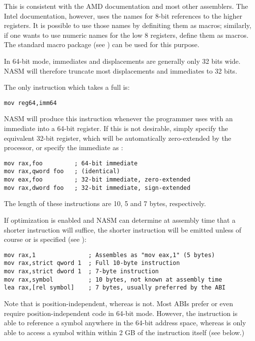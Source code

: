 This is consistent with the AMD documentation and most other
assemblers. The Intel documentation, however, uses the names
 for 8-bit references to the higher registers. It is
possible to use those names by definiting them as macros; similarly,
if one wants to use numeric names for the low 8 registers, define them
as macros. The standard macro package  (see
) can be used for this purpose.


In 64-bit mode, immediates and displacements are generally only 32
bits wide. NASM will therefore truncate most displacements and
immediates to 32 bits.

The only instruction which takes a full  is:

\begin{lstlisting}
mov reg64,imm64
\end{lstlisting}

NASM will produce this instruction whenever the programmer uses
 with an immediate into a 64-bit register. If this is not
desirable, simply specify the equivalent 32-bit register, which will
be automatically zero-extended by the processor, or specify the
immediate as :

\begin{lstlisting}
mov rax,foo         ; 64-bit immediate
mov rax,qword foo   ; (identical)
mov eax,foo         ; 32-bit immediate, zero-extended
mov rax,dword foo   ; 32-bit immediate, sign-extended
\end{lstlisting}

The length of these instructions are 10, 5 and 7 bytes, respectively.

If optimization is enabled and NASM can determine at assembly time
that a shorter instruction will suffice, the shorter instruction will
be emitted unless of course  or 
is specified (see ):

\begin{lstlisting}
mov rax,1               ; Assembles as "mov eax,1" (5 bytes)
mov rax,strict qword 1  ; Full 10-byte instruction
mov rax,strict dword 1  ; 7-byte instruction
mov rax,symbol          ; 10 bytes, not known at assembly time
lea rax,[rel symbol]    ; 7 bytes, usually preferred by the ABI
\end{lstlisting}

Note that  is position-independent, whereas
 is not. Most ABIs prefer or even require
position-independent code in 64-bit mode. However, the 
instruction is able to reference a symbol anywhere in the 64-bit
address space, whereas  is only able to access a symbol within
within 2 GB of the instruction itself (see below.)

